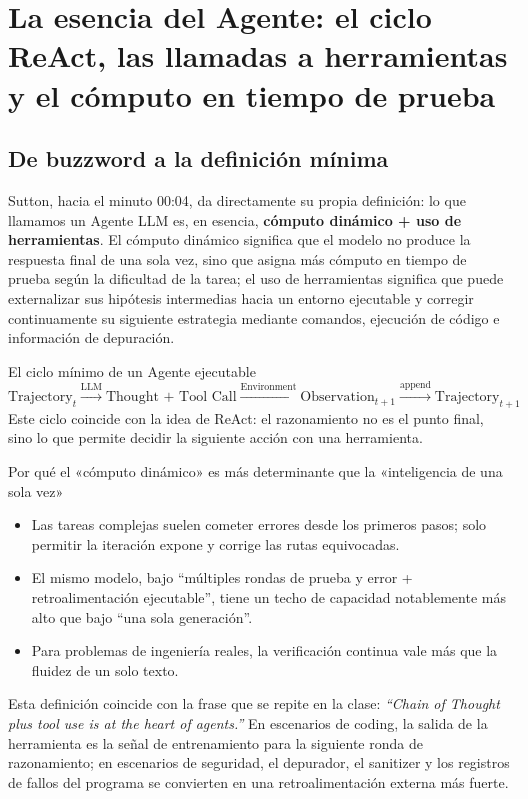 \section{La esencia del Agente: el ciclo ReAct, las llamadas a herramientas y el cómputo en tiempo de prueba}

\subsection{De buzzword a la definición mínima}
Sutton, hacia el minuto 00:04, da directamente su propia definición: lo que llamamos un Agente LLM es, en esencia, \textbf{cómputo dinámico + uso de herramientas}. El cómputo dinámico significa que el modelo no produce la respuesta final de una sola vez, sino que asigna más cómputo en tiempo de prueba según la dificultad de la tarea; el uso de herramientas significa que puede externalizar sus hipótesis intermedias hacia un entorno ejecutable y corregir continuamente su siguiente estrategia mediante comandos, ejecución de código e información de depuración.

\begin{knowledgebox}{El ciclo mínimo de un Agente ejecutable}
\[
\text{Trajectory}_{t}
\xrightarrow{\text{LLM}}
\text{Thought + Tool Call}
\xrightarrow{\text{Environment}}
\text{Observation}_{t+1}
\xrightarrow{\text{append}}
\text{Trajectory}_{t+1}
\]
Este ciclo coincide con la idea de ReAct: el razonamiento no es el punto final, sino lo que permite decidir la siguiente acción con una herramienta.
\end{knowledgebox}

\begin{importantbox}{Por qué el «cómputo dinámico» es más determinante que la «inteligencia de una sola vez»}
\begin{itemize}
    \item Las tareas complejas suelen cometer errores desde los primeros pasos; solo permitir la iteración expone y corrige las rutas equivocadas.
    \item El mismo modelo, bajo ``múltiples rondas de prueba y error + retroalimentación ejecutable'', tiene un techo de capacidad notablemente más alto que bajo ``una sola generación''.
    \item Para problemas de ingeniería reales, la verificación continua vale más que la fluidez de un solo texto.
\end{itemize}
\end{importantbox}

Esta definición coincide con la frase que se repite en la clase: \textit{``Chain of Thought plus tool use is at the heart of agents.''} En escenarios de coding, la salida de la herramienta es la señal de entrenamiento para la siguiente ronda de razonamiento; en escenarios de seguridad, el depurador, el sanitizer y los registros de fallos del programa se convierten en una retroalimentación externa más fuerte.

